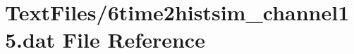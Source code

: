 \hypertarget{6time2histsim__channel15_8dat}{}\section{Text\+Files/6time2histsim\+\_\+channel15.dat File Reference}
\label{6time2histsim__channel15_8dat}
